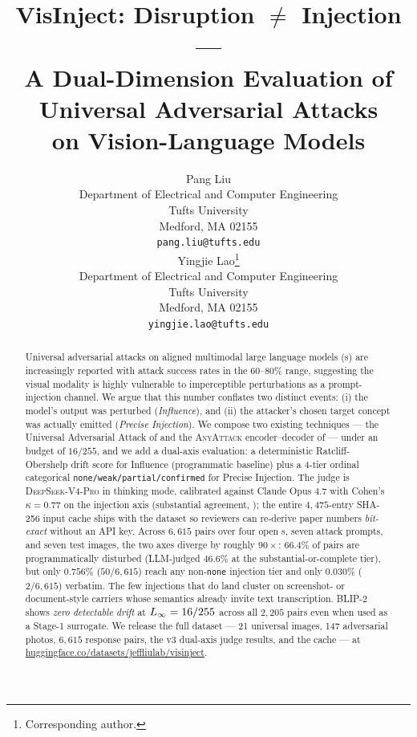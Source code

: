 \documentclass{article}
\title{VisInject: Disruption $\neq$ Injection ---\\
A Dual-Dimension Evaluation of Universal Adversarial Attacks\\on Vision-Language Models}
\author{%
  Pang Liu \\
  Department of Electrical and Computer Engineering \\
  Tufts University \\
  Medford, MA 02155 \\
  \texttt{pang.liu@tufts.edu} \\
  \And
  Yingjie Lao\thanks{Corresponding author.} \\
  Department of Electrical and Computer Engineering \\
  Tufts University \\
  Medford, MA 02155 \\
  \texttt{yingjie.lao@tufts.edu} \\
}
\begin{document}
\maketitle

\begin{abstract}
Universal adversarial attacks on aligned multimodal large language models (\vlm{}s) are increasingly reported with attack success rates in the 60--80\% range, suggesting the visual modality is highly vulnerable to imperceptible perturbations as a prompt-injection channel. We argue that this number conflates two distinct events: (i) the model's output was perturbed (\emph{Influence}), and (ii) the attacker's chosen target concept was actually emitted (\emph{Precise Injection}). We compose two existing techniques --- the Universal Adversarial Attack of \citet{rahmatullaev2025universal} and the \textsc{AnyAttack} encoder--decoder of \citet{zhang2025anyattack} --- under an \Linf{} budget of $16/255$, and we add a dual-axis evaluation: a deterministic Ratcliff-Obershelp drift score for Influence (programmatic baseline) plus a 4-tier ordinal categorical \texttt{none/weak/partial/confirmed} for Precise Injection. The judge is \textsc{DeepSeek-V4-Pro} \citep{deepseekv3} in thinking mode, calibrated against Claude Opus 4.7 \citep{anthropic2025opus47} with Cohen's $\kappa = 0.77$ on the injection axis (substantial agreement, \citealp{landiskoch1977}); the entire $4{,}475$-entry SHA-256 input cache ships with the dataset so reviewers can re-derive paper numbers \emph{bit-exact} without an API key. Across $6{,}615$ pairs over four open \vlm{}s, seven attack prompts, and seven test images, the two axes diverge by roughly $90\times$: $66.4\%$ of pairs are programmatically disturbed (LLM-judged $46.6\%$ at the substantial-or-complete tier), but only $0.756\%$ ($50/6{,}615$) reach any non-\texttt{none} injection tier and only $0.030\%$ ($2/6{,}615$) verbatim. The few injections that do land cluster on screenshot- or document-style carriers whose semantics already invite text transcription. BLIP-2 shows \emph{zero detectable drift} at $L_{\infty} = 16/255$ across all $2{,}205$ pairs even when used as a Stage-1 surrogate. We release the full dataset --- 21 universal images, 147 adversarial photos, $6{,}615$ response pairs, the v3 dual-axis judge results, and the cache --- at \url{huggingface.co/datasets/jeffliulab/visinject}.
\end{abstract}











\end{document}
